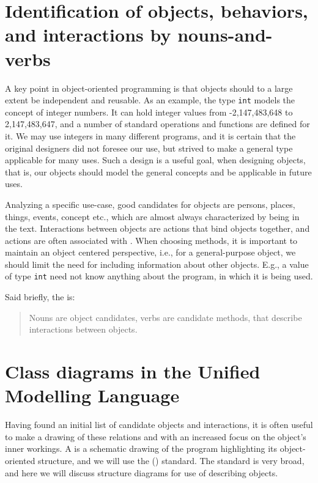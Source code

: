 \section{Identification of objects, behaviors, and interactions by nouns-and-verbs}
A key point in object-oriented programming is that objects should to a large extent be independent and reusable. As an example, the type \lstinline|int| models the concept of integer numbers. It can hold integer values from -2,147,483,648 to 2,147,483,647, and a number of standard operations and functions are defined for it. We may use integers in many different programs, and it is certain that the original designers did not foresee our use, but strived to make a general type applicable for many uses. Such a design is a useful goal, when designing objects, that is, our objects should model the general concepts and be applicable in future uses. 

Analyzing a specific use-case, good candidates for objects are persons, places, things, events, concept etc., which are almost always characterized by being  in the text. Interactions between objects are actions that bind objects together, and actions are often associated with . When choosing methods, it is important to maintain an object centered perspective, i.e., for a general-purpose object, we should limit the need for including information about other objects. E.g., a value of type \lstinline|int| need not know anything about the program, in which it is being used.

Said briefly, the  is:
%
\begin{quote}
  Nouns are object candidates, verbs are candidate methods, that describe interactions between objects.
\end{quote}
%

\section{Class diagrams in the Unified Modelling Language}
Having found an initial list of candidate objects and interactions, it is often useful to make a drawing of these relations and with an increased focus on the object's inner workings. A  is a schematic drawing of the program highlighting its object-oriented structure, and we will use the  () \cite{uml2} standard. The standard is very broad, and here we will discuss structure diagrams for use of describing objects. 

